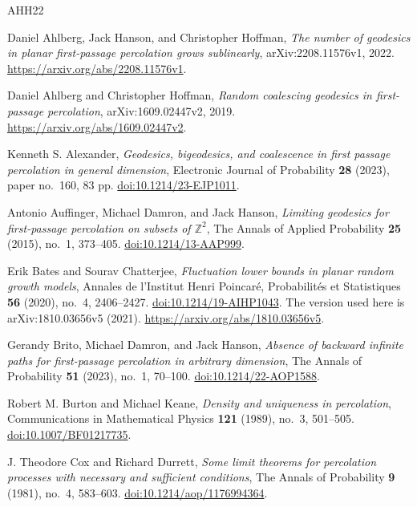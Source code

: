 \begin{thebibliography}{AHH22}

Daniel Ahlberg, Jack Hanson, and Christopher Hoffman,
\emph{The number of geodesics in planar first-passage percolation grows sublinearly},
arXiv:2208.11576v1, 2022.
\url{https://arxiv.org/abs/2208.11576v1}.

Daniel Ahlberg and Christopher Hoffman,
\emph{Random coalescing geodesics in first-passage percolation},
arXiv:1609.02447v2, 2019.
\url{https://arxiv.org/abs/1609.02447v2}.

Kenneth S. Alexander,
\emph{Geodesics, bigeodesics, and coalescence in first passage percolation in general dimension},
Electronic Journal of Probability \textbf{28} (2023), paper no.~160, 83 pp.
\href{https://doi.org/10.1214/23-EJP1011}{doi:10.1214/23-EJP1011}.

Antonio Auffinger, Michael Damron, and Jack Hanson,
\emph{Limiting geodesics for first-passage percolation on subsets of \(\mathbb Z^2\)},
The Annals of Applied Probability \textbf{25} (2015), no.~1, 373--405.
\href{https://doi.org/10.1214/13-AAP999}{doi:10.1214/13-AAP999}.

Erik Bates and Sourav Chatterjee,
\emph{Fluctuation lower bounds in planar random growth models},
Annales de l'Institut Henri Poincar\'e, Probabilit\'es et Statistiques
\textbf{56} (2020), no.~4, 2406--2427.
\href{https://doi.org/10.1214/19-AIHP1043}{doi:10.1214/19-AIHP1043}.
The version used here is arXiv:1810.03656v5 (2021).
\url{https://arxiv.org/abs/1810.03656v5}.

Gerandy Brito, Michael Damron, and Jack Hanson,
\emph{Absence of backward infinite paths for first-passage percolation in arbitrary dimension},
The Annals of Probability \textbf{51} (2023), no.~1, 70--100.
\href{https://doi.org/10.1214/22-AOP1588}{doi:10.1214/22-AOP1588}.

Robert M. Burton and Michael Keane,
\emph{Density and uniqueness in percolation},
Communications in Mathematical Physics \textbf{121} (1989), no.~3, 501--505.
\href{https://doi.org/10.1007/BF01217735}{doi:10.1007/BF01217735}.

J. Theodore Cox and Richard Durrett,
\emph{Some limit theorems for percolation processes with necessary and sufficient conditions},
The Annals of Probability \textbf{9} (1981), no.~4, 583--603.
\href{https://doi.org/10.1214/aop/1176994364}{doi:10.1214/aop/1176994364}.


\end{thebibliography}
